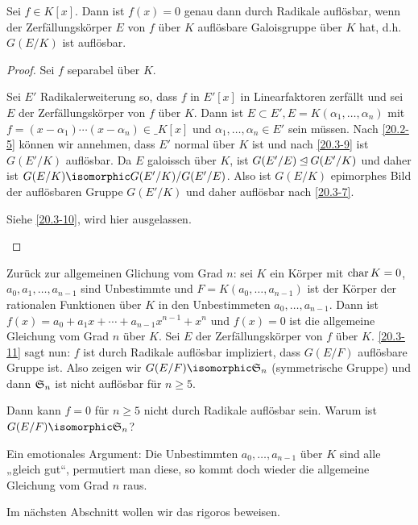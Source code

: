 \begin{kor} \label{20.3-11}
	Sei $f \in K[x]$.
	Dann ist $f(x) = 0$ genau dann durch Radikale auflösbar, wenn der Zerfällungskörper $E$ von $f$ über $K$ auflösbare Galoisgruppe über $K$ hat, d.h. $G(E / K)$ ist auflösbar.
	\begin{proof}
		Sei \oBdA $f$ separabel über $K$.
		\begin{seg}{\ProofImplication}
			Sei $E'$ Radikalerweiterung so, dass $f$ in $E'[x]$ in Linearfaktoren zerfällt und sei $E$ der Zerfällungskörper von $f$ über $K$.
			Dann ist $E \subset E', E = K(\alpha_1, \dotsc, \alpha_n)$ mit $f = (x-\alpha_1) \dotsb (x-\alpha_n) \in \_K[x]$ und $\alpha_1, \dotsc, \alpha_n \in E'$ sein müssen.
			Nach \ref{20.2-5} können wir annehmen, dass $E'$ normal über $K$ ist und nach \ref{20.3-9} ist $G(E' / K)$ auflösbar.
			Da $E$ galoissch über $K$, ist $G(E' / E) \NormalDivisor G(E' / K)$ und daher ist $G(E / K) \isomorphic G(E' / K) / G(E' / E)$.
			Also ist $G(E / K)$ epimorphes Bild der auflösbaren Gruppe $G(E' / K)$ und daher auflösbar nach \ref{20.3-7}.
		\end{seg}
		\begin{seg}{\ProofImplication*}
			Siehe \ref{20.3-10}, wird hier ausgelassen.
		\end{seg}
	\end{proof}
\end{kor}

Zurück zur allgemeinen Glichung vom Grad $n$:
sei $K$ ein Körper mit $\Char K = 0$, $a_0, a_1, \dotsc, a_{n-1}$ sind Unbestimmte und $F = K(a_0, \dotsc, a_{n-1})$ ist der Körper der rationalen Funktionen über $K$ in den Unbestimmeten $a_0, \dotsc, a_{n-1}$.
Dann ist $f(x) = a_0 + a_1 x + \dotsb + a_{n-1} x^{n-1} + x^n$ und $f(x) = 0$ ist die allgemeine Gleichung vom Grad $n$ über $K$.
Sei $E$ der Zerfällungskörper von $f$ über $K$.
\ref{20.3-11} sagt nun: $f$ ist durch Radikale auflösbar impliziert, dass $G(E / F)$ auflösbare Gruppe ist.
Also zeigen wir $G(E / F) \isomorphic \S_n$ (symmetrische Gruppe) und dann $\S_n$ ist nicht auflösbar für $n \ge 5$.

Dann kann $f = 0$ für $n \ge 5$ nicht durch Radikale auflösbar sein.
Warum ist $G(E / F) \isomorphic \S_n$?

Ein emotionales Argument: Die Unbestimmten $a_0, \dotsc, a_{n-1}$ über $K$ sind alle „gleich gut“, permutiert man diese, so kommt doch wieder die allgemeine Gleichung vom Grad $n$ raus.

Im nächsten Abschnitt wollen wir das rigoros beweisen.


